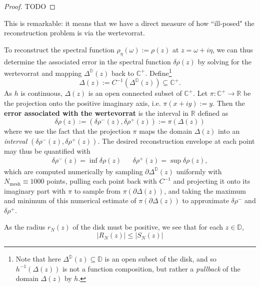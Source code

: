 \begin{proof}
    TODO
\end{proof}

This is remarkable: it means that we have a direct measure of how ``ill-posed" the reconstruction problem is via the wertevorrat.

To reconstruct the spectral function $\rho_\eta(\omega) := \rho(z)$ at $z = \omega + i\eta$, we can thus determine the associated error in the spectral function $\delta\rho(z)$ by solving for the wertevorrat and mapping $\Delta^{\mathbb D}(z)$ back to $\mathbb C^+$. Define\footnote{Note that here $\Delta^{\mathbb D}(z)\subseteq\mathbb D$ is an open subset of the disk, and so $h^{-1}(\Delta(z))$ is not a function composition, but rather a \textit{pullback} of the domain $\Delta(z)$ by $h$.}
\begin{equation}
    \Delta(z) := C^{-1}(\Delta^{\mathbb D}(z)) \subseteq\mathbb C^+.
\end{equation}
As $h$ is continuous, $\Delta(z)$ is an open connected subset of $\mathbb C^+$. Let $\pi : \mathbb C^+\rightarrow \mathbb R$ be the projection onto the positive imaginary axis, i.e. $\pi(x + iy) := y$. Then the \textbf{error associated with the wertevorrat} is the interval in $\mathbb R$ defined as
\begin{equation}
    \delta\rho(z) := (\delta\rho^-(z), \delta\rho^+(z)) := \pi \left( \Delta(z) \right)
\end{equation}
where we use the fact that the projection $\pi$ maps the domain $\Delta(z)$ into an \textit{interval} $(\delta\rho^-(z), \delta\rho^+(z))$. The desired reconstruction envelope at each point may thus be quantified with
\begin{align}
    \delta\rho^-(z) = \inf \delta \rho(z) && \delta\rho^+(z) = \sup \delta \rho(z),
\end{align}
which are computed numerically by sampling $\partial\Delta^{\mathbb D}(z)$ uniformly with $N_{\mathrm{mesh}}\equiv 1000$ points, pulling each point back with $C^{-1}$ and projecting it onto its imaginary part with $\pi$ to sample from $\pi(\partial\Delta(z))$, and taking the maximum and minimum of this numerical estimate of  $\pi(\partial\Delta(z))$ to approximate $\delta\rho^-$ and $\delta\rho^+$. 


As the radius $r_N(z)$ of the disk must be positive, we see that for each $z\in\mathbb D$,
\begin{equation}
    |R_N(z)|\leq |S_N(z)|
\end{equation}


